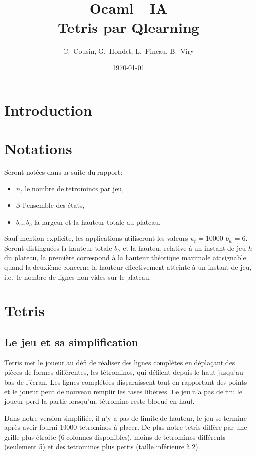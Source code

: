 \documentclass{report}
\title{Ocaml---IA\\Tetris par Qlearning}
\author{C.~Cousin, G.~Hondet, L.~Pineau, B.~Viry}
\date{\today}
\begin{document}
\maketitle
\tableofcontents

\chapter*{Introduction}

\chapter*{Notations}
Seront notées dans la suite du rapport:
\begin{itemize}
  \item \(n_t\) le nombre de tetrominos par jeu,
  \item \(\mathcal{S}\) l'ensemble des états,
  \item \(b_w, b_h\) la largeur et la hauteur totale du plateau.
\end{itemize}
Sauf mention explicite, les applications utiliseront les valeurs \(n_t=10000,
b_w = 6\). Seront distinguées la hauteur totale \(b_h\) et la hauteur relative
à un instant de jeu \(h\) du plateau, la première correspond à la hauteur
théorique maximale atteignable quand la deuxième concerne la hauteur
effectivement atteinte à un instant de jeu, i.e.\ le nombre de lignes non vides
sur le plateau.

\chapter{Tetris}

\section{Le jeu et sa simplification}
Tetris met le joueur au défi de réaliser des lignes complètes en déplaçant des
pièces de formes différentes, les tétrominos, qui défilent depuis le haut
jusqu'au bas de l'écran. Les lignes complétées disparaissent tout en rapportant
des points et le joueur peut de nouveau remplir les cases libérées. Le jeu
n'a pas de fin: le joueur perd la partie lorsqu'un tétromino reste bloqué en
haut.

Dans notre version simplifiée, il n'y a pas de limite de hauteur, le jeu se
termine après avoir fourni 10000 tetrominos à placer. De plus notre
tetris diffère par une grille plus étroite (6 colonnes disponibles), moins de
tetrominos différents (seulement 5) et des tetrominos plus petits (taille
inférieure à 2).
\end{document}
